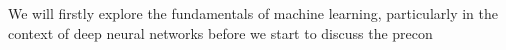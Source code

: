 We will firstly explore the fundamentals of machine learning, particularly in the context of deep neural networks before we start to discuss the precon